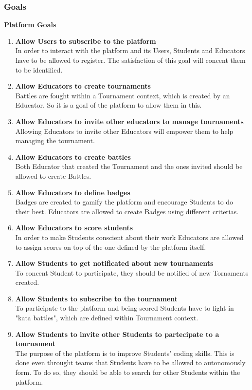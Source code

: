 \newpage

\subsubsection{Goals}
\textbf{Platform Goals}
\begin{enumerate}[label=$\bullet$ \textbf{GP\arabic*:}]
    \item \textbf{Allow Users to subscribe to the platform}\\In order to interact with the platform and its Users, Students and Educators have to be allowed to register. The satisfaction of this goal will concent them to be identified.
    \item \textbf{Allow Educators to create tournaments}\\Battles are fought within a Tournament context, which is created by an Educator. So it is a goal of the platform to allow them in this. 
    \item \textbf{Allow Educators to invite other educators to manage tournaments}\\Allowing Educators to invite other Educators will empower them to help managing the tournament. 
    \item \textbf{Allow Educators to create battles}\\Both Educator that created the Tournament and the ones invited should be allowed to create Battles. 
    \item \textbf{Allow Educators to define badges}\\Badges are created to gamify the platform and encourage Students to do their best. Educators are allowed to create Badges using different criterias.
    \item \textbf{Allow Educators to score students}\\In order to make Students conscient about their work Educators are allowed to assign scores on top of the one defined by the platform itself.
    \item \textbf{Allow Students to get notificated about new tournaments}\\To concent Student to participate, they should be notified of new Tornaments created.
    \item \textbf{Allow Students to subscribe to the tournament}\\To participate to the platform and being scored Students have to fight in "kata battles", which are defined within Tournament context.
    \item \textbf{Allow Students to invite other Students to partecipate to a tournament}\\The purpose of the platform is to improve Students' coding skills. This is done even throught teams that Students have to be allowed to autonomously form. To do so, they should be able to search for other Students within the platform.
\end{enumerate}
